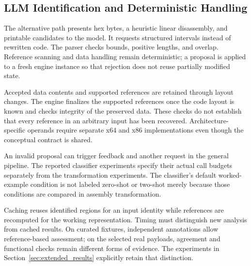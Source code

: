 \subsection{LLM Identification and Deterministic Handling}
The alternative path presents hex bytes, a heuristic linear disassembly,
and printable candidates to the model. It requests structured intervals
instead of rewritten code. The parser checks bounds, positive lengths,
and overlap. Reference scanning and data handling remain deterministic;
a proposal is applied to a fresh engine instance so that rejection
does not reuse partially modified state.

Accepted data contents and supported references are retained through
layout changes. The engine finalizes the supported references once
the code layout is known and checks integrity of the preserved data.
These checks do not establish that every reference in an arbitrary
input has been recovered. Architecture-specific operands require
separate x64 and x86 implementations even though the conceptual
contract is shared.

An invalid proposal can trigger feedback and another request in the
general pipeline. The reported classifier experiments specify their
actual call budgets separately from the transformation experiments.
The classifier's default worked-example condition is not labeled
zero-shot or two-shot merely because those conditions are compared
in assembly transformation.

Caching reuses identified regions for an input identity while references
are recomputed for the working representation. Timing must distinguish
new analysis from cached results. On curated fixtures, independent
annotations allow reference-based assessment; on the selected real
payloads, agreement and functional checks remain different forms of
evidence. The experiments in Section~\ref{sec:extended_results}
explicitly retain that distinction.
